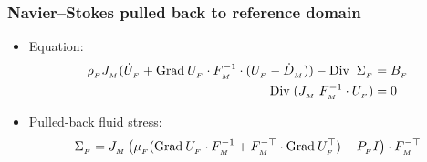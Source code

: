 \begin{frame}
  \frametitle{Navier--Stokes pulled back to reference domain}

  \begin{itemize}
  \item
    Equation:
    \small
    \begin{equation*}
      \begin{split}
        \rho_{_{F}}{J}_{_{M}}(\dot{U}_{_{F}} + \textrm{Grad}\:U_{_{F}}\cdot {F}_{_{M}}^{-1}\cdot (U_{_{F}}-\dot{D}_{_{M}} ))
        - \textrm{Div}\; \; \Sigma_{_{F}}
        & = B_{_{F}} \\
        \textrm{Div}\;({J}_{_{M}}\;{F}_{_{M}}^{-1}\cdot U_{_{F}}) & = 0
      \end{split}
    \end{equation*}
    \normalsize
  \item<2->
    Pulled-back fluid stress:
    \begin{equation*}
      \Sigma_{_{F}} = {J}_{_{M}} \left(\mu_{_{F}}(\textrm{Grad}\:U_{_{F}} \cdot {F}_{_{M}}^{-1} + {F}_{_{M}}^{-\top}\cdot 
      \textrm{Grad}\:U_{_{F}} ^{\top})  - P_{_{F}} I \right) \cdot{F}_{_{M}}^{-\top}
    \end{equation*}
  \end{itemize}

\end{frame}
